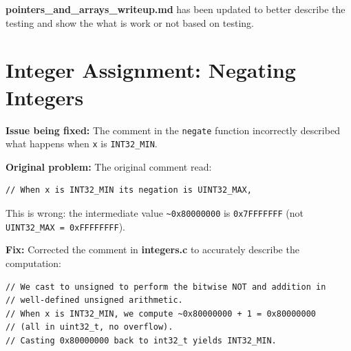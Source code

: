 \documentclass{exam}
\begin{document}
\textbf{pointers\_and\_arrays\_writeup.md} has been updated to better describe the testing and show the what is work or not based on testing.

\section*{Integer Assignment: Negating Integers}

\textbf{Issue being fixed:} The comment in the \verb|negate| function incorrectly described what happens when \verb|x| is \verb|INT32_MIN|.

\textbf{Original problem:} The original comment read:
\begin{verbatim}
// When x is INT32_MIN its negation is UINT32_MAX,
\end{verbatim}
This is wrong: the intermediate value \verb|~0x80000000| is \verb|0x7FFFFFFF| (not \verb|UINT32_MAX = 0xFFFFFFFF|).

\textbf{Fix:} Corrected the comment in \textbf{integers.c} to accurately describe the computation:
\begin{verbatim}
// We cast to unsigned to perform the bitwise NOT and addition in
// well-defined unsigned arithmetic.
// When x is INT32_MIN, we compute ~0x80000000 + 1 = 0x80000000
// (all in uint32_t, no overflow).
// Casting 0x80000000 back to int32_t yields INT32_MIN.
\end{verbatim}
\end{document}
